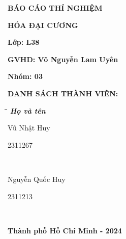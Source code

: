 \documentclass[12pt,a4paper]{report}
\begin{document}
\begin{titlepage}
\begin{center}
    \vspace{10pt}
    \fontsize{18pt}{17pt}\selectfont 
    \textbf{BÁO CÁO THÍ NGHIỆM} 
    
    \vspace{7pt}
    \textbf{HÓA ĐẠI CƯƠNG}
\end{center}

\begin{center}
    \vspace{15pt}
\textbf{Lớp: L38}
\end{center}

\begin{center}
    \vspace{15pt}
\textbf{GVHD: Võ Nguyễn Lam Uyên}
\end{center}

\begin{center}
\vspace{15pt}
\textbf{Nhóm: 03}
\end{center}

\vspace{10pt}
\textbf{DANH SÁCH THÀNH VIÊN:}
    \begin{tabbing}
\hspace{8cm}\=\hspace{3cm}\=\hspace{3cm} \kill
{\it \textbf{Họ và tên}}\\
\begin{bfseries}Vũ Nhật Huy \end{bfseries}\> \begin{bfseries}2311267 \end{bfseries}\> \begin{bfseries} \end{bfseries}\\
\begin{bfseries}Nguyễn Quốc Huy \end{bfseries}\> \begin{bfseries}2311213 \end{bfseries}\> \begin{bfseries} \end{bfseries}\\
\end{tabbing}

\vfill
\centerline{\bf Thành phố Hồ Chí Minh - 2024}
\vspace{1cm}
\end{titlepage}
\onehalfspacing
\newpage

\tableofcontents
\thispagestyle{empty}
\newpage
\end{document}
